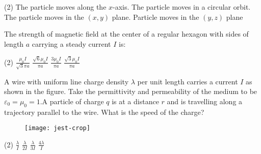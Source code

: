 \begin{enumerate}
\begin{minipage}{\textwidth}
\end{minipage}
\begin{tasks}(2)
	\task[\textbf{A.}] The particle moves along the $x$-axis.
	\task[\textbf{B.}]The particle moves in a circular orbit.
	\task[\textbf{C.}]The particle moves in the $(x, y)$ plane.
	\task[\textbf{D.}] Particle moves in the $(y, z)$ plane
\end{tasks}
\begin{minipage}{\textwidth}
	\item The strength of magnetic field at the center of a regular hexagon with sides of length $a$ carrying a steady current $I$ is:
\end{minipage}
\begin{tasks}(2)
	\task[\textbf{A.}] $\frac{\mu_{0} I}{\sqrt{3} \pi a}$ 
	\task[\textbf{B.}]$\frac{\sqrt{6} \mu_{0} I}{\pi a}$
	\task[\textbf{C.}]$\frac{3 \mu_{0} I}{\pi a}$
	\task[\textbf{D.}]$\frac{\sqrt{3} \mu_{0} I}{\pi a}$
\end{tasks}
\begin{minipage}{\textwidth}
	\item A wire with uniform line charge density $\lambda$ per unit length carries a current $I$ as shown in the figure. Take the permittivity and permeability of the medium to be $\varepsilon_{0}=\mu_{0}=1 . \mathrm{A}$ particle of charge $q$ is at a distance $r$ and is travelling along a trajectory parallel to the wire. What is the speed of the charge?
	\begin{figure}[H]
		\centering
		\texttt{[image: jest-crop]}
	\end{figure}
\end{minipage}
\begin{tasks}(2)
	\task[\textbf{A.}] $\frac{\lambda}{I}$ 
	\task[\textbf{B.}]$\frac{\lambda}{2 I}$
	\task[\textbf{C.}]$\frac{\lambda}{3 I}$
	\task[\textbf{D.}]$\frac{4 \lambda}{I}$
\end{tasks}
\end{enumerate}

